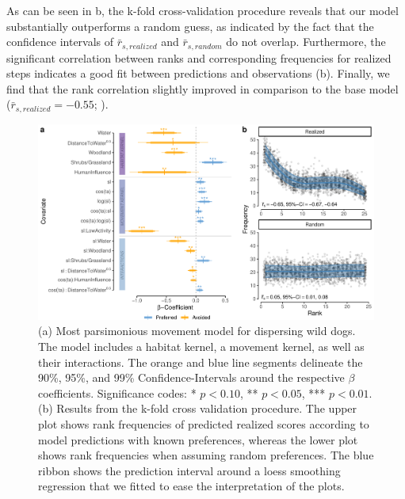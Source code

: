 \documentclass[abstract=on,10pt,a4paper,bibliography=totocnumbered]{article}
\begin{document}
As can be seen in b, the k-fold cross-validation procedure
reveals that our model substantially outperforms a random guess, as indicated by
the fact that the confidence intervals of \(\bar{r}_{s, realized}\) and
\(\bar{r}_{s, random}\) do not overlap. Furthermore, the significant correlation
between ranks and corresponding frequencies for realized steps indicates a good
fit between predictions and observations (b). Finally, we
find that the rank correlation slightly improved in comparison to the base model
(\(\bar{r}_{s, realized} = -0.55\); \citealp{Hofmann.2021}).

\begin{figure}
  \begin{center}
    \includegraphics[width=\textwidth]{99_MovementModel}
    \caption{(a) Most parsimonious movement model for dispersing wild dogs. The
    model includes a habitat kernel, a movement kernel, as well as their
    interactions. The orange and blue line segments delineate the 90\%, 95\%,
    and 99\% Confidence-Intervals around the respective \(\beta\) coefficients.
    Significance codes: * \(p < 0.10\), ** \(p < 0.05\), *** \(p < 0.01\). (b)
    Results from the k-fold cross validation procedure. The upper plot shows
    rank frequencies of predicted realized scores according to model predictions
    with known preferences, whereas the lower plot shows rank frequencies when
    assuming random preferences. The blue ribbon shows the prediction interval
    around a loess smoothing regression that we fitted to ease the
    interpretation of the plots.}
    \label{MovementModel}
  \end{center}
\end{figure}
\end{document}
